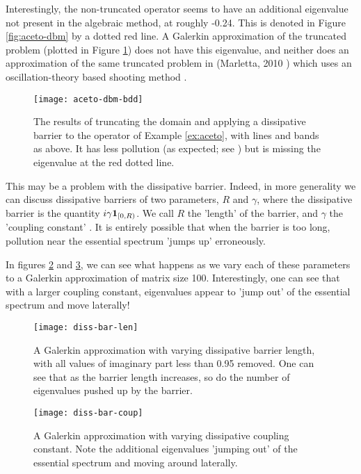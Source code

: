 \documentclass[../main.tex]{subfiles}
\begin{document}
Interestingly, the non-truncated operator seems to have an additional eigenvalue
not present in the algebraic method, at roughly -0.24. This is denoted
in Figure \ref{fig:aceto-dbm} by a dotted red line. A Galerkin approximation 
of the truncated problem (plotted in Figure \ref{fig:aceto-dbm-bdd})
does not have this eigenvalue, and neither does an approximation of the
same truncated problem in (Marletta, 2010 \cite{marletta2010neumann}) which uses an
oscillation-theory based shooting method \cite{greenberg1997algorithm}. 

\begin{figure}[h!]
\centering
\texttt{[image: aceto-dbm-bdd]}
\caption{The results of truncating the domain and applying a dissipative
	barrier to the operator of Example \ref{ex:aceto}, with lines and bands
  as above. It has less pollution (as expected; see \cite{aceto2006numerical})
  but is missing the eigenvalue at the red dotted line.}
\label{fig:aceto-dbm-bdd}
\end{figure}

This may be a problem with the dissipative barrier. Indeed, in more generality we can discuss
dissipative barriers of two parameters, $R$ and $\gamma$, where the dissipative barrier is the
quantity $i \gamma \mathbf{1}_{[0, R)}$. We call $R$ the 'length' of the barrier, and $\gamma$ the
'coupling constant' \cite{stepanenko2022spectral}. It is entirely possible that when the barrier
is too long, pollution near the essential spectrum 'jumps up' erroneously.

In figures \ref{fig:dbm-len} and \ref{fig:dbm-coup}, we can see what happens as we vary each of
these parameters to a Galerkin approximation of matrix size 100.
Interestingly, one can see that with a larger coupling constant, eigenvalues
appear to 'jump out' of the essential spectrum and move laterally!

\begin{figure}[p!]
  \centering
  \texttt{[image: diss-bar-len]}
  \caption{A Galerkin approximation with varying dissipative barrier length,
  with all values of imaginary part less than 0.95 removed. One can see that
  as the barrier length increases, so do the number of eigenvalues pushed up
  by the barrier.}
  \label{fig:dbm-len}
\end{figure}

\begin{figure}[p!]
  \centering
  \texttt{[image: diss-bar-coup]}
  \caption{A Galerkin approximation with varying dissipative coupling constant.
  Note the additional eigenvalues 'jumping out' of the essential spectrum and
  moving around laterally.}
  \label{fig:dbm-coup}
\end{figure}
\clearpage
\end{document}
